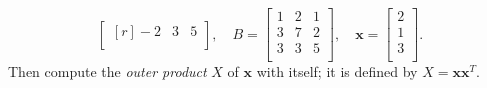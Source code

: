 \begin{enumerate}
\begin{equation*}
\begin{bmatrix*}[r]
        -2 & 3 & 5 \\
      \end{bmatrix*}, \quad
      B = \begin{bmatrix}
        1 & 2 & 1 \\
        3 & 7 & 2 \\
        3 & 3 & 5 \\
      \end{bmatrix}, \quad
      \mathbf{x} = \begin{bmatrix}
        2 \\
        1 \\
        3 \\
      \end{bmatrix}.
    \end{equation*}
    Then compute the \emph{outer product} $X$ of $\mathbf{x}$ with itself; it is defined by $X = \mathbf{x} \mathbf{x}^{T}$.
\end{enumerate}
\begin{solution}
  \quad
  
\end{solution}

